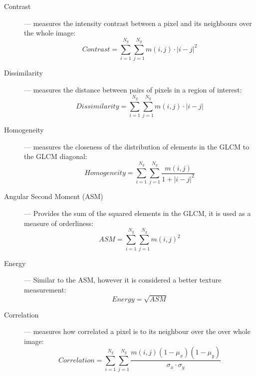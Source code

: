 \documentclass[../main.tex]{subfile}
\begin{document}
    \begin{description}
        \item[Contrast] --- measures the intensity contrast between a pixel and its neighbours over the whole image:
        \begin{equation}
            Contrast = \sum^{N_{g}}_{i=1} \sum^{N_{g}}_{j=1} m(i,j) \cdot \lvert i - j \rvert^{2}
            \label{eq:contrast}
        \end{equation}
        
        \item[Dissimilarity] --- measures the distance between pairs of \mbox{pixels} in a region of interest:
        \begin{equation}
            Dissimilarity = \sum^{N_{g}}_{i=1} \sum^{N_{g}}_{j=1} m(i,j) \cdot \lvert i - j \rvert
            \label{eq:dissimilarity}
        \end{equation}
        
        \item[Homogeneity] --- measures the closeness of the distribution of elements in the GLCM to the GLCM diagonal:
        \begin{equation}
            Homogeneity = \sum^{N_{g}}_{i=1} \sum^{N_{g}}_{j=1} \frac{m(i,j)}{1 + \lvert i - j \rvert^{2}}
            \label{eq:homogeneity}
        \end{equation}
        
        \item[Angular Second Moment (ASM)] --- Provides the sum of the squared elements in the GLCM, it is used as a measure of orderliness:
        \begin{equation}
            ASM = \sum^{N_{g}}_{i=1} \sum^{N_{g}}_{j=1} m(i,j)^{2}
            \label{eq:asm}
        \end{equation}
        
        \item[Energy] --- Similar to the ASM, however it is considered a better texture measurement:
        \begin{equation}
            Energy = \sqrt{ASM}
            \label{eq:energy}
        \end{equation}
        
        \item[Correlation] --- measures how correlated a pixel  is to its neighbour over the over whole image:
        \begin{equation}
            Correlation = \sum^{N_{g}}_{i=1} \sum^{N_{g}}_{j=1} \frac{m(i,j) \left(1 - \mu_{x}\right) \left(1 - \mu_{y}\right)}{\sigma_{x} \cdot \sigma_{y}}
            \label{eq:correlation}
        \end{equation}
    \end{description}
    
\end{document}
